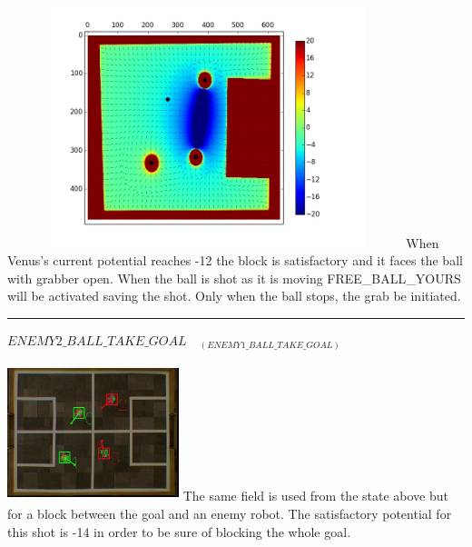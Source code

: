 \documentclass[a4paper,12pt]{article}
\begin{document}
\hspace{.2cm}
\begin{minipage}{0.5\textwidth}\raggedright
\includegraphics[height=70mm,width=115mm]{p1.jpg}\newline\newline
When Venus's current potential reaches -12 the block is satisfactory and it faces the ball with grabber open. When the ball is shot as it is moving FREE\_BALL\_YOURS will be activated saving the shot. Only when the ball stops, the grab be initiated.
\end{minipage}\newline\newline
\rule{\textwidth}{1pt}\newline
$ENEMY2\_BALL\_TAKE\_GOAL\quad_{(ENEMY1\_BALL\_TAKE\_GOAL)}$ \newline \newline
\begin{minipage}{0.5\textwidth}
\includegraphics[height=40mm,width=50mm]{v1_2.jpg}\newline
The same field is used from the state above but for a block between the goal and an enemy robot. The satisfactory potential for this shot is -14 in order to be sure of blocking the whole goal.
\end{minipage}
\hspace{.2cm}
\end{document}
